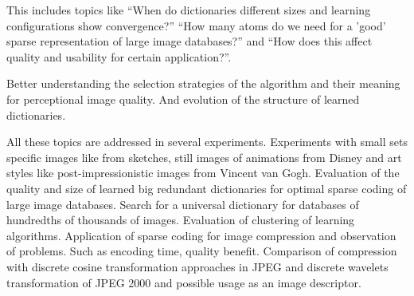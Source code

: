 This includes topics like ``When do dictionaries different sizes and
learning configurations show convergence?'' ``How many atoms do we need for a
'good' sparse representation of large image databases?''  and ``How does this
affect quality and usability for certain application?''. 

Better understanding the selection strategies of the algorithm and their
meaning for perceptional image quality. And evolution of the structure of
learned dictionaries. 

All these topics are addressed in several experiments. Experiments with
small sets specific images like from sketches, still images of animations from
Disney and art styles like post-impressionistic images from Vincent van Gogh.
Evaluation of the quality and size of learned big redundant dictionaries for
optimal sparse coding of large image databases. Search for a universal
dictionary for databases of hundredths of thousands of images. Evaluation of
clustering of learning algorithms. Application of sparse coding for image
compression and observation of problems. Such as encoding time, quality benefit.
Comparison of compression with discrete cosine transformation approaches in JPEG
and discrete wavelets transformation of JPEG 2000 and possible usage as an image
descriptor.







